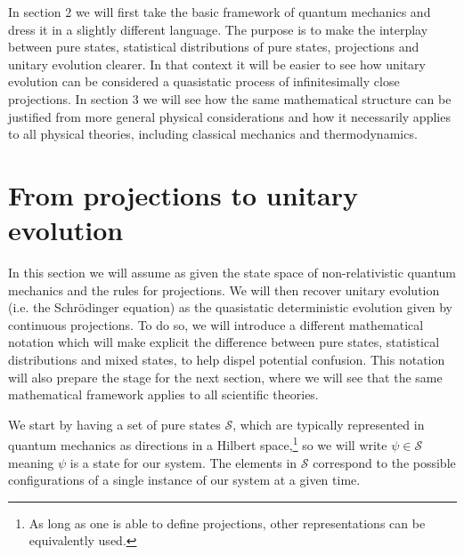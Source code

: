 \documentclass[applsci,article,submit,moreauthors,pdftex]{Definitions/mdpi}
\begin{document}
In section 2 we will first take the basic framework of quantum mechanics and dress it in a slightly different language. The purpose is to make the interplay between pure states, statistical distributions of pure states, projections and unitary evolution clearer. In that context it will be easier to see how unitary evolution can be considered a quasistatic process of infinitesimally close projections. In section 3 we will see how the same mathematical structure can be justified from more general physical considerations and how it necessarily applies to all physical theories, including classical mechanics and thermodynamics. 

\section{From projections to unitary evolution}

In this section we will assume as given the state space of non-relativistic quantum mechanics and the rules for projections. We will then recover unitary evolution (i.e. the Schr\"{o}dinger equation) as the quasistatic deterministic evolution given by continuous projections. To do so, we will introduce a different mathematical notation which will make explicit the difference between pure states, statistical distributions and mixed states, to help dispel potential confusion. This notation will also prepare the stage for the next section, where we will see that the same mathematical framework applies to all scientific theories.

We start by having a set of pure states $\mathcal{S}$, which are typically represented in quantum mechanics as directions in a Hilbert space,\footnote{As long as one is able to define projections, other representations can be equivalently used.} so we will write $\psi \in \mathcal{S}$ meaning $\psi$ is a state for our system. The elements in $\mathcal{S}$ correspond to the possible configurations of a single instance of our system at a given time.
\end{document}
